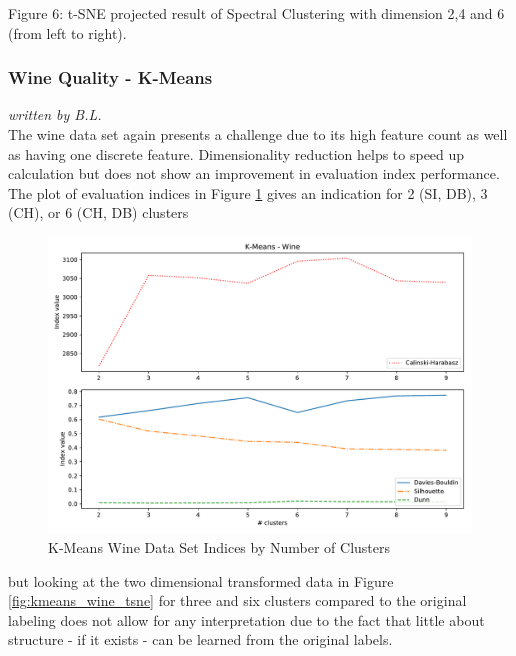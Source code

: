  Figure 6:  t-SNE projected result of Spectral Clustering with dimension 2,4 and 6 (from left to right). \newline

\subsubsection{Wine Quality - K-Means}
\textit{written by B.L.}\\


The wine data set again presents a challenge due to its high feature count as well as having one discrete feature. Dimensionality reduction helps to speed up calculation but does not show an improvement in evaluation index performance. The plot of evaluation indices in Figure \ref{fig:kmeans_wine_indices_comparison} gives an indication for 2 (\gls{SI}, \gls{DB}), 3 (\gls{CH}), or 6 (\gls{CH}, \gls{DB}) clusters

\begin{figure}[H]
\begin{center}
\includegraphics[width=1.0\textwidth]{images/kmeans_wine_index_plot.pdf}
\end{center}
\caption{K-Means Wine Data Set Indices by Number of Clusters}
\label{fig:kmeans_wine_indices_comparison}
\end{figure}

but looking at the two dimensional transformed data in Figure \ref{fig:kmeans_wine_tsne} for three and six clusters compared to the original labeling does not allow for any interpretation due to the fact that little about structure - if it exists - can be learned from the original labels.

